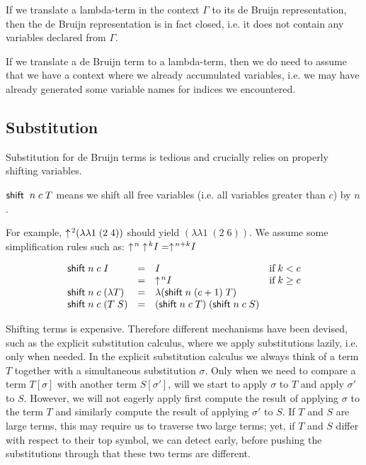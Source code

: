 If we translate a lambda-term in the context $\Gamma$ to its de Bruijn
representation, then the de Bruijn representation is in fact closed,
i.e. it does not contain any variables declared from $\Gamma$.

If we translate a de Bruijn term to a lambda-term, then we do need to
assume that we have a context where we already accumulated variables,
i.e. we may have already generated some variable names for indices we
encountered.

\subsection*{Substitution} Substitution for de Bruijn terms is tedious
and crucially relies on properly shifting variables.


$\textsf{shift}\;\;n\;c\;T$ means we shift all free variables (i.e. all
variables greater than $c$) by $n$.

For example, $\uparrow\!^2 (\lambda \lambda 1\;(2\;4))$ should yield
$(\lambda \lambda 1\;(2\;6))$. We assume some simplification rules
such as: $\uparrow\!^n \uparrow\!^k I = \uparrow\! ^{n+k} I$

\[
\begin{array}{lcll}
\textsf{shift}\; n \;c \; I & = & I  & \mbox{if}\; k < c \\
                   & =  & \uparrow\!^n I &\mbox{if}\; k \geq c \\
\textsf{shift}\; n\;c \; (\lambda T) & = & \lambda (\textsf{shift}\; n\;(c+1)\;T)\\
\textsf{shift}\; n\;c\; (T\;S)       & = & (\textsf{shift}\; n \;c\; T)\;(\textsf{shift}\; n \;c\;S)
\end{array}
\]


Shifting terms is expensive. Therefore different mechanisms have
been devised, such as the explicit substitution calculus, where we
apply substitutions lazily, i.e. only when needed. In the explicit
substitution calculus we always think of a term $T$ together with a
simultaneous substitution $\sigma$. Only when we need to compare a term
$T[\sigma]$ with another term $S[\sigma']$, will we start to apply
$\sigma$ to $T$ and  apply $\sigma'$ to $S$. However, we will not
eagerly apply first compute the result of applying $\sigma$ to the
term $T$ and similarly compute the result of applying $\sigma'$ to
$S$. If $T$ and $S$ are large terms, this may require us to traverse
two large terms; yet, if $T$ and $S$ differ with respect to their top
symbol, we can detect early, before pushing the substitutions through
that these two terms are different.



